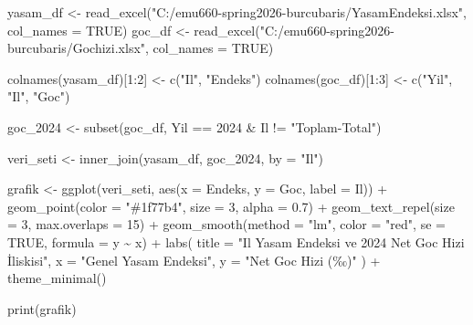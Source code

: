 \documentclass[
  11pt,
  a4paper,
  DIV=11,
  numbers=noendperiod]{scrartcl}
\newenvironment{Shaded}{\begin{snugshade}}{\end{snugshade}}
\newcommand{\AttributeTok}[1]{\textcolor[rgb]{0.40,0.45,0.13}{#1}}
\newcommand{\ConstantTok}[1]{\textcolor[rgb]{0.56,0.35,0.01}{#1}}
\newcommand{\DecValTok}[1]{\textcolor[rgb]{0.68,0.00,0.00}{#1}}
\newcommand{\FloatTok}[1]{\textcolor[rgb]{0.68,0.00,0.00}{#1}}
\newcommand{\FunctionTok}[1]{\textcolor[rgb]{0.28,0.35,0.67}{#1}}
\newcommand{\NormalTok}[1]{\textcolor[rgb]{0.00,0.23,0.31}{#1}}
\newcommand{\OtherTok}[1]{\textcolor[rgb]{0.00,0.23,0.31}{#1}}
\newcommand{\SpecialCharTok}[1]{\textcolor[rgb]{0.37,0.37,0.37}{#1}}
\newcommand{\StringTok}[1]{\textcolor[rgb]{0.13,0.47,0.30}{#1}}
\begin{document}
\begin{Shaded}
\begin{Highlighting}[]
\NormalTok{yasam\_df }\OtherTok{\textless{}{-}} \FunctionTok{read\_excel}\NormalTok{(}\StringTok{"C:/emu660{-}spring2026{-}burcubaris/YasamEndeksi.xlsx"}\NormalTok{, }\AttributeTok{col\_names =} \ConstantTok{TRUE}\NormalTok{)}
\NormalTok{goc\_df }\OtherTok{\textless{}{-}} \FunctionTok{read\_excel}\NormalTok{(}\StringTok{"C:/emu660{-}spring2026{-}burcubaris/Gochizi.xlsx"}\NormalTok{, }\AttributeTok{col\_names =} \ConstantTok{TRUE}\NormalTok{)}

\FunctionTok{colnames}\NormalTok{(yasam\_df)[}\DecValTok{1}\SpecialCharTok{:}\DecValTok{2}\NormalTok{] }\OtherTok{\textless{}{-}} \FunctionTok{c}\NormalTok{(}\StringTok{"Il"}\NormalTok{, }\StringTok{"Endeks"}\NormalTok{)}
\FunctionTok{colnames}\NormalTok{(goc\_df)[}\DecValTok{1}\SpecialCharTok{:}\DecValTok{3}\NormalTok{]   }\OtherTok{\textless{}{-}} \FunctionTok{c}\NormalTok{(}\StringTok{"Yil"}\NormalTok{, }\StringTok{"Il"}\NormalTok{, }\StringTok{"Goc"}\NormalTok{)}

\NormalTok{goc\_2024 }\OtherTok{\textless{}{-}} \FunctionTok{subset}\NormalTok{(goc\_df, Yil }\SpecialCharTok{==} \DecValTok{2024} \SpecialCharTok{\&}\NormalTok{ Il }\SpecialCharTok{!=} \StringTok{"Toplam{-}Total"}\NormalTok{)}

\NormalTok{veri\_seti }\OtherTok{\textless{}{-}} \FunctionTok{inner\_join}\NormalTok{(yasam\_df, goc\_2024, }\AttributeTok{by =} \StringTok{"Il"}\NormalTok{)}

\NormalTok{grafik }\OtherTok{\textless{}{-}} \FunctionTok{ggplot}\NormalTok{(veri\_seti, }\FunctionTok{aes}\NormalTok{(}\AttributeTok{x =}\NormalTok{ Endeks, }\AttributeTok{y =}\NormalTok{ Goc, }\AttributeTok{label =}\NormalTok{ Il)) }\SpecialCharTok{+} 
  \FunctionTok{geom\_point}\NormalTok{(}\AttributeTok{color =} \StringTok{"\#1f77b4"}\NormalTok{, }\AttributeTok{size =} \DecValTok{3}\NormalTok{, }\AttributeTok{alpha =} \FloatTok{0.7}\NormalTok{) }\SpecialCharTok{+} 
  \FunctionTok{geom\_text\_repel}\NormalTok{(}\AttributeTok{size =} \DecValTok{3}\NormalTok{, }\AttributeTok{max.overlaps =} \DecValTok{15}\NormalTok{) }\SpecialCharTok{+} 
  \FunctionTok{geom\_smooth}\NormalTok{(}\AttributeTok{method =} \StringTok{"lm"}\NormalTok{, }\AttributeTok{color =} \StringTok{"red"}\NormalTok{, }\AttributeTok{se =} \ConstantTok{TRUE}\NormalTok{, }\AttributeTok{formula =}\NormalTok{ y }\SpecialCharTok{\textasciitilde{}}\NormalTok{ x) }\SpecialCharTok{+} 
  \FunctionTok{labs}\NormalTok{(}
    \AttributeTok{title =} \StringTok{"Il Yasam Endeksi ve 2024 Net Goc Hizi İliskisi"}\NormalTok{,}
    \AttributeTok{x =} \StringTok{"Genel Yasam Endeksi"}\NormalTok{,}
    \AttributeTok{y =} \StringTok{"Net Goc Hizi (‰)"}
\NormalTok{  ) }\SpecialCharTok{+}
  \FunctionTok{theme\_minimal}\NormalTok{()}

\FunctionTok{print}\NormalTok{(grafik)}
\end{Highlighting}
\end{Shaded}
\end{document}
